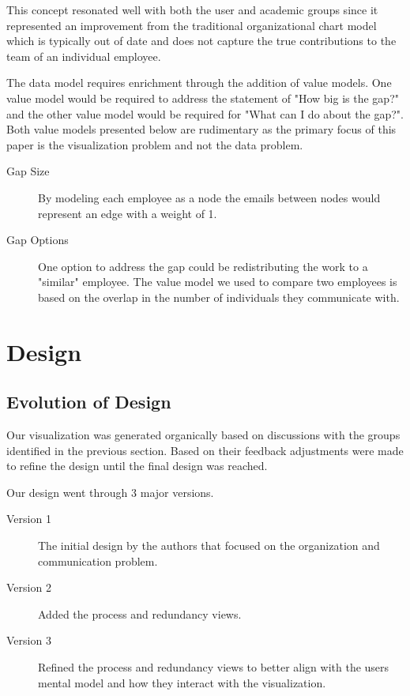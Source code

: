 \message{ !name(FinalPaper.tex)}\documentclass[journal]{vgtc}                %
\begin{document}
This concept resonated well with both the user and academic groups since it represented an improvement from the traditional organizational chart model which is typically out of date and does not capture the true contributions to the team of an individual employee.

The data model requires enrichment through the addition of value models.  One value model would be required to address the statement of "How big is the gap?" and the other value model would be required for "What can I do about the gap?".  Both value models presented below are rudimentary as the primary focus of this paper is the visualization problem and not the data problem.

\begin{description}
\item [Gap Size] By modeling each employee as a node the emails between nodes would represent an edge with a weight of 1.
\item [Gap Options] One option to address the gap could be redistributing the work to a "similar" employee. The value model we used to compare two employees is based on the overlap in the number of individuals they communicate with. 
\end{description}

\section{Design}
\label{sec:design}

\subsection{Evolution of Design}
Our visualization was generated organically based on discussions with the groups identified in the previous section.  Based on their feedback adjustments were made to refine the design until the final design was reached.

Our design went through 3 major versions.
\begin{description}
	\item [Version 1] The initial design by the authors that focused on the organization and communication problem.
	\item [Version 2] Added the process and redundancy views.
	\item [Version 3] Refined the process and redundancy views to better align with the users mental model and how they interact with the visualization.
\end{description}
\end{document}
